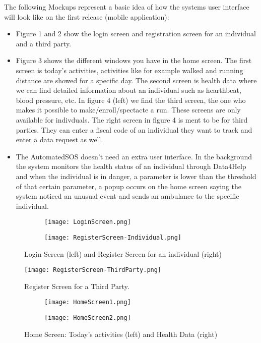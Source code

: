\documentclass[12pt]{article}
\begin{document}
The following Mockups represent a basic idea of how the systems user interface will look like on the first release (mobile application):
\begin{itemize}
    \item Figure 1 and 2 show the login screen and registration screen for an individual and a third party.
    \item Figure 3 shows the different windows you have in the home screen. The first screen is today's activities, activities like for example walked and running distance are showed for a specific day. The second screen is health data where we can find detailed information about an individual such as hearthbeat, blood pressure, etc. In figure 4 (left) we find the third screen, the one who makes it possible to make/enroll/spectacte a run. These screens are only available for indivduals. The right screen in figure 4 is ment to be for third parties. They can enter a fiscal code of an individual they want to track and enter a data request as well. 
    \item The AutomatedSOS doesn't need an extra user interface. In the background the system monitors  the health status of an individual through Data4Help and when the individual is in danger, a parameter is lower than the threshold of that certain parameter, a popup occurs on the home screen saying the system noticed an unusual event and sends an ambulance to the specific individual.
\end{itemize}

\newpage
\begin{figure}[t!]
\centering
    \begin{subfigure}{.4\textwidth}
        \texttt{[image: LoginScreen.png]}
        \label{fig:loginScreen}
    \end{subfigure}%
    \begin{subfigure}{.4\textwidth}
        \texttt{[image: RegisterScreen-Individual.png]}
        \label{fig:RegisterScreen-Individual}
    \end{subfigure}
    \caption{Login Screen (left) and  Register Screen for an individual (right)}
\end{figure}

\begin{figure}[H]
\centering
\texttt{[image: RegisterScreen-ThirdParty.png]}
\label{fig:RegisterScreen-ThirdParty}
\caption{Register Screen for a Third Party.}
\end{figure}

\begin{figure}[t!]
\centering
    \begin{subfigure}{.4\textwidth}
        \texttt{[image: HomeScreen1.png]}
        \label{fig:HomeScreen1}
    \end{subfigure}%
    \begin{subfigure}{.4\textwidth}
        \texttt{[image: HomeScreen2.png]}
        \label{fig:HomeScreen2}
    \end{subfigure}
    \caption{Home Screen: Today's activities (left) and Health Data (right)}
\end{figure}
\end{document}
